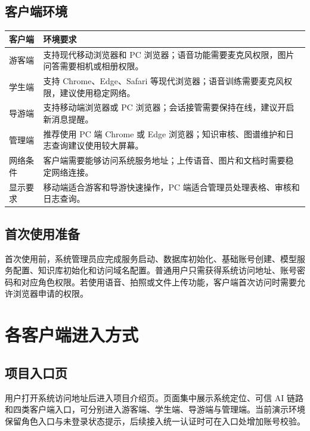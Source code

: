\subsection{客户端环境}

\begin{longtable}{p{3.0cm}p{10.4cm}}
\toprule
客户端 & 环境要求 \\
\midrule
游客端 & 支持现代移动浏览器和 PC 浏览器；语音功能需要麦克风权限，图片问答需要相机或相册权限。 \\
学生端 & 支持 Chrome、Edge、Safari 等现代浏览器；语音训练需要麦克风权限，建议使用稳定网络。 \\
导游端 & 支持移动端浏览器或 PC 浏览器；会话接管需要保持在线，建议开启新消息提醒。 \\
管理端 & 推荐使用 PC 端 Chrome 或 Edge 浏览器；知识审核、图谱维护和日志查询建议使用较大屏幕。 \\
网络条件 & 客户端需要能够访问系统服务地址；上传语音、图片和文档时需要稳定网络连接。 \\
显示要求 & 移动端适合游客和导游快速操作，PC 端适合管理员处理表格、审核和日志查询。 \\
\bottomrule
\end{longtable}

\subsection{首次使用准备}

首次使用前，系统管理员应完成服务启动、数据库初始化、基础账号创建、模型服务配置、知识库初始化和访问域名配置。普通用户只需获得系统访问地址、账号密码和对应角色权限。若使用语音、拍照或文件上传功能，客户端首次访问时需要允许浏览器申请的权限。

\section{各客户端进入方式}

\subsection{项目入口页}

用户打开系统访问地址后进入项目介绍页。页面集中展示系统定位、可信 AI 链路和四类客户端入口，可分别进入游客端、学生端、导游端与管理端。当前演示环境保留角色入口与未登录状态提示，后续接入统一认证时可在入口处增加账号校验。


